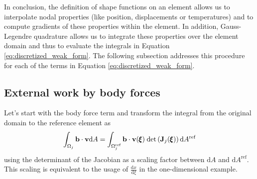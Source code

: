 In conclusion, the definition of shape functions on an element allows us to interpolate nodal properties (like position, displacements or temperatures) and to compute gradients of these properties within the element. In addition, Gauss-Legendre quadrature allows us to integrate these properties over the element domain and thus to evaluate the integrals in Equation \eqref{eq:discretized_weak_form}. The following subsection addresses this procedure for each of the terms in Equation \eqref{eq:discretized_weak_form}.

\subsection{External work by body forces}
Let's start with the body force term and transform the integral from the original domain to the reference element as
\begin{equation}
    \int_{\Omega_j} \mathbf{b} \cdot \mathbf{v} \text{d}A
    = 
    \int_{\Omega_j^\textrm{ref}} \mathbf{b} \cdot \mathbf{v}(\pmb{\xi})
    \hspace{0.25em} \text{det}\left(\mathbf{J}_j(\pmb{\xi})\right)\text{d}A^\textrm{ref}
\end{equation}
using the determinant of the Jacobian as a scaling factor between $\text{d}A$ and $\text{d}A^\textrm{ref}$. This scaling is equivalent to the usage of $\frac{\text{d}x}{\text{d}\xi}$ in the one-dimensional example. 

